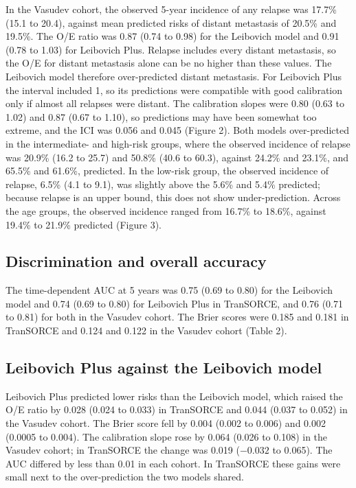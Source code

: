 \documentclass[11pt,a4paper]{article}
\begin{document}
In the Vasudev cohort, the observed 5-year incidence of any relapse was 17.7\% (15.1 to 20.4), against mean predicted risks of distant metastasis of 20.5\% and 19.5\%.
The O/E ratio was 0.87 (0.74 to 0.98) for the Leibovich model and 0.91 (0.78 to 1.03) for Leibovich Plus.
Relapse includes every distant metastasis, so the O/E for distant metastasis alone can be no higher than these values.
The Leibovich model therefore over-predicted distant metastasis.
For Leibovich Plus the interval included 1, so its predictions were compatible with good calibration only if almost all relapses were distant.
The calibration slopes were 0.80 (0.63 to 1.02) and 0.87 (0.67 to 1.10), so predictions may have been somewhat too extreme, and the ICI was 0.056 and 0.045 (Figure 2).
Both models over-predicted in the intermediate- and high-risk groups, where the observed incidence of relapse was 20.9\% (16.2 to 25.7) and 50.8\% (40.6 to 60.3), against 24.2\% and 23.1\%, and 65.5\% and 61.6\%, predicted.
In the low-risk group, the observed incidence of relapse, 6.5\% (4.1 to 9.1), was slightly above the 5.6\% and 5.4\% predicted; because relapse is an upper bound, this does not show under-prediction.
Across the age groups, the observed incidence ranged from 16.7\% to 18.6\%, against 19.4\% to 21.9\% predicted (Figure 3).

\subsection*{Discrimination and overall accuracy}

The time-dependent AUC at 5 years was 0.75 (0.69 to 0.80) for the Leibovich model and 0.74 (0.69 to 0.80) for Leibovich Plus in TranSORCE, and 0.76 (0.71 to 0.81) for both in the Vasudev cohort.
The Brier scores were 0.185 and 0.181 in TranSORCE and 0.124 and 0.122 in the Vasudev cohort (Table 2).

\subsection*{Leibovich Plus against the Leibovich model}

Leibovich Plus predicted lower risks than the Leibovich model, which raised the O/E ratio by 0.028 (0.024 to 0.033) in TranSORCE and 0.044 (0.037 to 0.052) in the Vasudev cohort.
The Brier score fell by 0.004 (0.002 to 0.006) and 0.002 (0.0005 to 0.004).
The calibration slope rose by 0.064 (0.026 to 0.108) in the Vasudev cohort; in TranSORCE the change was 0.019 ($-0.032$ to 0.065).
The AUC differed by less than 0.01 in each cohort.
In TranSORCE these gains were small next to the over-prediction the two models shared.
\end{document}
